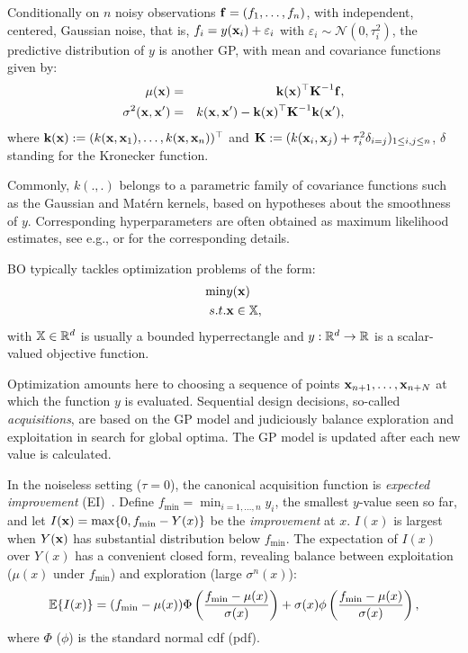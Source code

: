 	Conditionally on $n$ noisy observations $\mathbf{f} = (f_1, \ldots, f_n)$, with independent, centered, Gaussian noise,
	that is, $f_i = y(\mathbf{x}_i) + \varepsilon_i$ with $\varepsilon_i \sim \mathcal{N}(0, \tau_i^2)$,
	the predictive distribution of $y$ is another GP, with mean and covariance functions given by:
	\begin{eqnarray}
	\mu(\mathbf{x}) & =& \textbf{k}(\mathbf{x})^\top \textbf{K}^{-1} \mathbf{f},  \\
	\sigma^2(\mathbf{x}, \mathbf{x}') & =& k(\mathbf{x}, \mathbf{x}') - \textbf{k}(\mathbf{x})^\top \textbf{K}^{-1} \textbf{k}(\mathbf{x}'),
	\end{eqnarray}
	where $\textbf{k}(\mathbf{x}) := (k(\mathbf{x}, \mathbf{x}_1), \dots, k(\mathbf{x}, \mathbf{x}_n))^\top$ and $\textbf{K} := (k(\mathbf{x}_i, \mathbf{x}_j) + \tau_i^2 \delta_{i=j})_{1 \leq i,j \leq n}$,
	$\delta$ standing for the Kronecker function.
	
	Commonly, $k(.,.)$ belongs to a parametric family of covariance functions such as the Gaussian and Mat\'ern kernels, 
	based on hypotheses about the smoothness of $y$. Corresponding hyperparameters are often obtained as maximum likelihood estimates, 
	see e.g., \citet{Rasmussen2006} or \citet{Roustant2012} for the corresponding details.   
	
	BO typically tackles optimization problems of the form:
	\begin{eqnarray*}
		\min & y(\mathbf{x}) \\
		s.t. & \mathbf{x} \in \mathbb{X},
	\end{eqnarray*}
	with $\mathbb{X} \in \mathbb{R}^d$ is usually a bounded hyperrectangle and $y:\mathbb{R}^d \rightarrow \mathbb{R}$ is a scalar-valued objective function.
	
	Optimization amounts here to choosing a sequence of points $\mathbf{x}_{n+1}, \ldots, \mathbf{x}_{n+N}$ at which the function $y$ is evaluated.
	Sequential design decisions, so-called {\em acquisitions}, are based on the GP model and judiciously balance exploration and exploitation 
	in search for global optima. The GP model is updated after each new value is calculated.
	
	In the noiseless setting ($\tau=0$), the canonical acquisition function is {\em expected improvement} (EI)~\cite{jones1998efficient}. 
	Define $f_{\min} = \min_{i=1,\ldots,n} y_i$, the smallest $y$-value seen so
	far, and let $I(\mathbf{x}) = \max\{ 0, f_{\min} - Y(x) \}$
	be the {\em improvement} at $x$.  $I(x)$ is largest when $Y(\mathbf{x})$ has
	substantial distribution below $f_{\min}$. 
	The expectation of $I(x)$ over $Y(x)$ has a convenient closed form,
	revealing balance between exploitation ($\mu(x)$ under $f_{\min}$) and
	exploration (large $\sigma^{n}(x)$):
	\begin{equation}
	\mathbb{E} \{I(x)\} = (f_{\min} - \mu(x)) \Phi\left(
	\frac{f_{\min} - \mu(x)}{\sigma(x)}\right)
	+ \sigma(x) \phi\left(
	\frac{f_{\min} - \mu(x)}{\sigma(x)}\right),
	\label{eq:ei}
	\end{equation}
	where $\Phi$ ($\phi$) is the standard normal cdf (pdf).
	
